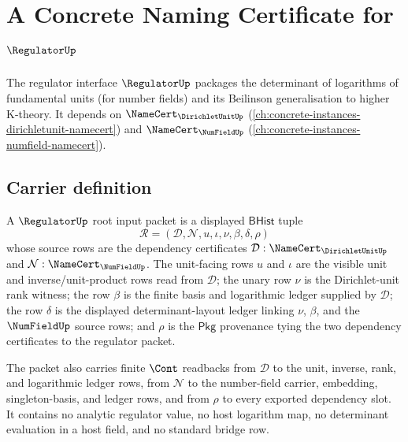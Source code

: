 \chapter{A Concrete Naming Certificate for $\RegulatorUp$}
\label{ch:concrete-instances-regulator-namecert}

The regulator interface $\RegulatorUp$ packages the determinant of logarithms of fundamental units (for number fields) and its Beilinson generalisation to higher K-theory. It depends on $\NameCert_{\DirichletUnitUp}$ (\autoref{ch:concrete-instances-dirichletunit-namecert}) and $\NameCert_{\NumFieldUp}$ (\autoref{ch:concrete-instances-numfield-namecert}).

\section{Carrier definition}
\label{sec:regulator-carrier}

\begin{definition}
\label{def:regulator-root-input-packet}
A $\RegulatorUp$ root input packet is a displayed $\mathsf{BHist}$ tuple
$$
\mathcal{R}=(\mathcal{D},\mathcal{N},u,\iota,\nu,\beta,\delta,\rho)
$$
whose source rows are the dependency certificates
$\mathcal{D}:\NameCert_{\DirichletUnitUp}$ and
$\mathcal{N}:\NameCert_{\NumFieldUp}$. The unit-facing rows $u$ and $\iota$ are
the visible unit and inverse/unit-product rows read from
$\mathcal{D}$; the unary row $\nu$ is the Dirichlet-unit rank witness; the row
$\beta$ is the finite basis and logarithmic ledger supplied by
$\mathcal{D}$; the row $\delta$ is the displayed determinant-layout ledger
linking $\nu$, $\beta$, and the $\NumFieldUp$ source rows; and $\rho$ is the
$\mathsf{Pkg}$ provenance tying the two dependency certificates to the
regulator packet.

The packet also carries finite $\Cont$ readbacks from $\mathcal{D}$ to the unit,
inverse, rank, and logarithmic ledger rows, from $\mathcal{N}$ to the
number-field carrier, embedding, singleton-basis, and ledger rows, and from
$\rho$ to every exported dependency slot. It contains no analytic regulator
value, no host logarithm map, no determinant evaluation in a host field, and no
standard bridge row.
\end{definition}

